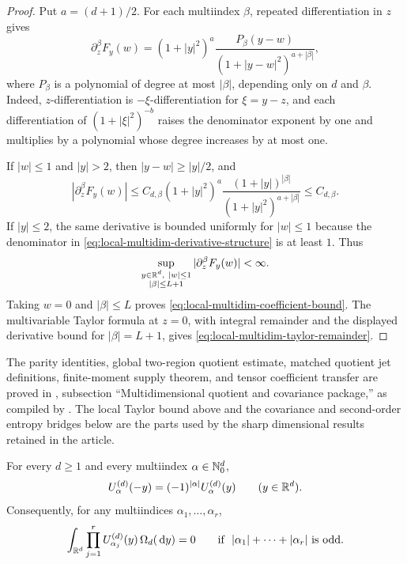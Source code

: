 \ifdefined\JFAArticleMain
{}
\else
\begin{proof}
Put \(a=(d+1)/2\).  For each multiindex \(\beta\), repeated
differentiation in \(z\) gives
\begin{equation}\label{eq:local-multidim-derivative-structure}
\partial_z^\beta F_y(w)
=(1+|y|^2)^a
\frac{P_\beta(y-w)}{(1+|y-w|^2)^{a+|\beta|}},
\end{equation}
where \(P_\beta\) is a polynomial of degree at most \(|\beta|\), depending
only on \(d\) and \(\beta\).  Indeed, \(z\)-differentiation is
\(-\xi\)-differentiation for \(\xi=y-z\), and each differentiation of
\((1+|\xi|^2)^{-b}\) raises the denominator exponent by one and multiplies
by a polynomial whose degree increases by at most one.

If \(|w|\le1\) and \(|y|>2\), then \(|y-w|\ge |y|/2\), and
\[
|\partial_z^\beta F_y(w)|
\le C_{d,\beta}
(1+|y|^2)^a
\frac{(1+|y|)^{|\beta|}}{(1+|y|^2)^{a+|\beta|}}
\le C_{d,\beta}.
\]
If \(|y|\le2\), the same derivative is bounded uniformly for \(|w|\le1\)
because the denominator in \eqref{eq:local-multidim-derivative-structure}
is at least \(1\).  Thus
\[
\sup_{\substack{y\in\mathbb{R}^d,\ |w|\le1\\ |\beta|\le L+1}}
|\partial_z^\beta F_y(w)|<\infty .
\]
Taking \(w=0\) and \(|\beta|\le L\) proves
\eqref{eq:local-multidim-coefficient-bound}.  The multivariable Taylor
formula at \(z=0\), with integral remainder and the displayed derivative
bound for \(|\beta|=L+1\), gives
\eqref{eq:local-multidim-taylor-remainder}.
\end{proof}
\fi

\ifdefined\JFAArticleMain
The parity identities, global two-region quotient estimate, matched quotient
jet definitions, finite-moment supply theorem, and tensor coefficient transfer
are proved in , subsection
``Multidimensional quotient and covariance package,'' as compiled by
.  The local Taylor bound above and
the covariance and second-order entropy bridges below are the parts used by
the sharp dimensional results retained in the article.
\else
\begin{lemma}%
\label{lem:multidim-cayley-poisson-mode-parity}
For every \(d\ge1\) and every multiindex \(\alpha\in\mathbb{N}_0^d\),
\begin{equation}\label{eq:multidim-cayley-poisson-mode-parity}
U_\alpha^{(d)}(-y)=(-1)^{|\alpha|}U_\alpha^{(d)}(y)
\qquad(y\in\mathbb{R}^d).
\end{equation}
Consequently, for any multiindices
\(\alpha_1,\ldots,\alpha_r\),
\begin{equation}\label{eq:multidim-cayley-poisson-product-parity}
\int_{\mathbb{R}^d}\prod_{j=1}^r
U_{\alpha_j}^{(d)}(y)\,\Omega_d(\,\mathrm{d} y)=0
\qquad\text{if }\ |\alpha_1|+\cdots+|\alpha_r|\text{ is odd}.
\end{equation}
\end{lemma}

